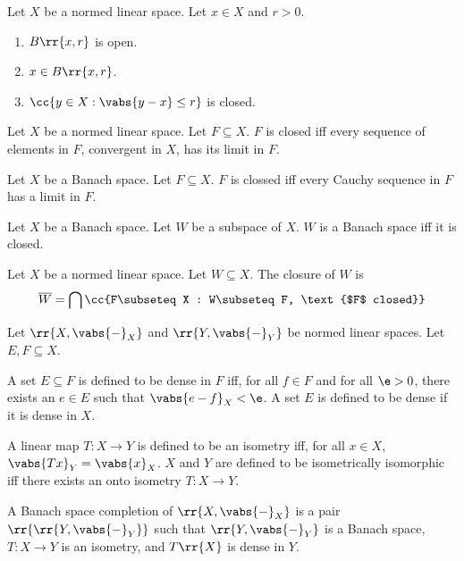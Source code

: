 \documentclass{article}
\begin{document}
\begin{theorem}
  Let $X$ be a normed linear space. Let $x\in X$ and $r>0$.
  \begin{enumerate}
    \item $B\rr{x,r}$ is open.
    \item $x\in B\rr{x,r}$.
    \item $\cc{y\in X : \vabs{y-x}\leq r}$ is closed.
  \end{enumerate}
\end{theorem}

\begin{theorem}
  Let $X$ be a normed linear space. Let $F\subseteq X$. $F$ is closed iff every sequence of
  elements in $F$, convergent in $X$, has its limit in $F$.
\end{theorem}

\begin{theorem}
  Let $X$ be a Banach space. Let $F\subseteq X$. $F$ is clossed iff every Cauchy sequence in
  $F$ has a limit in $F$.
\end{theorem}

\begin{theorem}
  Let $X$ be a Banach space. Let $W$ be a subspace of $X$. $W$ is a Banach space iff it is
  closed.
\end{theorem}

\begin{definition}
  \label{def:closure}
  Let $X$ be a normed linear space. Let $W\subseteq X$. The closure of $W$ is
  \begin{align*}
    \overline W = \bigcap \cc{F\subseteq X : W\subseteq F, \text{$F$ closed}}
  \end{align*}
\end{definition}

\begin{definition}
  Let $\rr{X, \vabs{-}_{X}}$ and $\rr{Y, \vabs{-}_{Y}}$ be normed linear spaces. Let $E,F\subseteq X$.

  A set $E\subseteq F$ is defined to be dense in $F$ iff, for all $f\in F$ and for all
  $\e > 0$, there exists an $e\in E$ such that $\vabs{e-f}_{X}<\e$. A set $E$ is defined
  to be dense if it is dense in $X$.

  A linear map $T:X\to Y$ is defined to be an isometry iff, for all $x\in X$,
  $\vabs{Tx}_{Y}=\vabs{x}_{X}$. $X$ and $Y$ are defined to be isometrically isomorphic iff
  there exists an onto isometry $T:X\to Y$.

  A Banach space completion of $\rr{X,\vabs{-}_{X}}$ is a pair $\rr{\rr{Y,\vabs{-}_{Y}}}$
  such that $\rr{Y,\vabs{-}_{Y}}$ is a Banach space, $T:X\to Y$ is an isometry, and $T\rr{X}$
  is dense in $Y$.
\end{definition}
\end{document}

